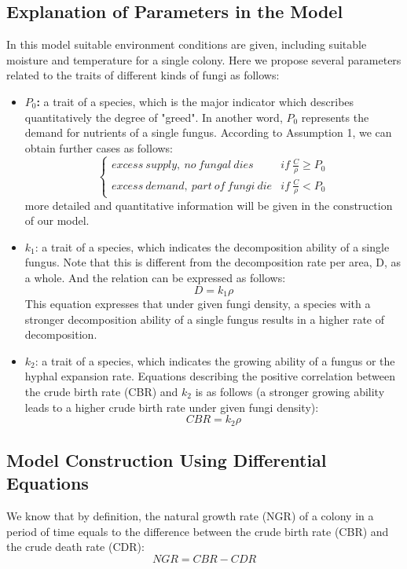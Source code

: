 \documentclass[12pt]{article}
\begin{document}
\subsection{Explanation of Parameters in the Model}
In this model suitable environment conditions are given, including suitable moisture and temperature for a single colony. Here we propose several parameters related to the traits of different kinds of fungi as follows:
\begin{itemize}
	\item \textbf{$P_{0}$:} a trait of a species, which is the major indicator which describes quantitatively the degree of "greed". In another word, $P_{0}$ represents the demand for nutrients of a single fungus. According to Assumption 1, we can obtain further cases as follows:
	\begin{equation}
		\begin{cases}
			excess\  supply,\  no\  fungal\  dies&if\  \frac{C}{\rho } \geqslant P_{0}\\ 
			excess\  demand,\  part\  of\  fungi\  die&if\  \frac{C}{\rho } <P_{0}
		\end{cases} 
	\end{equation} 
more detailed and quantitative information will be given in the construction of our model.
	\item $k_{1}$: a trait of a species, which indicates the decomposition ability of a single fungus. Note that this is different from the decomposition rate per area, D, as a whole. And the relation can be expressed as follows:
	\begin{equation}
		D=k_{1}\rho
	\end{equation} 
	This equation expresses that under given fungi density, a species with a stronger decomposition ability of a single fungus results in a higher rate of decomposition.
	\item $k_{2}$: a trait of a species, which indicates the growing ability of a fungus or the hyphal expansion rate. Equations describing the positive correlation between the crude birth rate (CBR) and $k_{2}$ is as follows (a stronger growing ability leads to a higher crude birth rate under given fungi density):
	\begin{equation}
		CBR=k_{2}\rho
	\end{equation}

\end{itemize}
\subsection{Model Construction Using Differential Equations}
We know that by definition, the natural growth rate (NGR) of a colony in a period of time equals to the difference between the crude birth rate (CBR) and the crude death rate (CDR):
\begin{equation}
	NGR=CBR-CDR
\end{equation}
\end{document}
